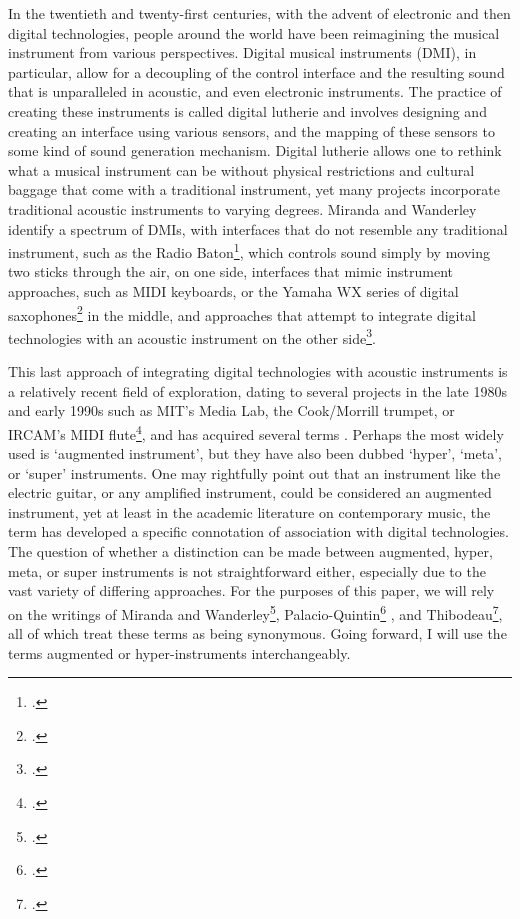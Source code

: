\documentclass[12pt,twoside,maitrise]{dms_ks}
\theoremstyle{definition}
\begin{document}

In the twentieth and twenty-first centuries, with the advent of electronic and then digital technologies, people around the world have been reimagining the musical instrument from various perspectives. 
Digital musical instruments (DMI), in particular, allow for a decoupling of the control interface and the resulting sound that is unparalleled in acoustic, and even electronic instruments.
The practice of creating these instruments is called digital lutherie and involves designing and creating an interface using various sensors, and the mapping of these sensors to some kind of sound generation mechanism.
Digital lutherie allows one to rethink what a musical instrument can be without physical restrictions and cultural baggage that come with a traditional instrument, yet many projects incorporate traditional acoustic instruments to varying degrees. 
Miranda and Wanderley identify a spectrum of DMIs, with interfaces that do not resemble any traditional instrument, such as the Radio Baton\footcite{miguel_ragussi_max_2013}, which controls sound simply by moving two sticks through the air, on one side, interfaces that mimic instrument approaches, such as MIDI keyboards, or the Yamaha WX series of digital saxophones\footcite{mkirino01_yamaha_2014} in the middle, and approaches that attempt to integrate digital technologies with an acoustic instrument on the other side\footcite[19-20]{miranda_new_2006}.



This last approach of integrating digital technologies with acoustic instruments is a relatively recent field of exploration, dating to several projects in the late 1980s and early 1990s such as MIT's Media Lab, the Cook/Morrill trumpet, or IRCAM's MIDI flute\footcite[22--25]{miranda_new_2006}, and has acquired several terms .
Perhaps the most widely used is `augmented instrument', but they have also been dubbed `hyper', `meta', or `super' instruments.
One may rightfully point out that an instrument like the electric guitar, or any amplified instrument, could be considered an augmented instrument, yet at least in the academic literature on contemporary music, the term has developed a specific connotation of association with digital technologies. 
The question of whether a distinction can be made between augmented, hyper, meta, or super instruments is not straightforward either, especially due to the vast variety of differing approaches.
For the purposes of this paper, we will rely on the writings of Miranda and Wanderley\footcite[21]{miranda_new_2006}, Palacio-Quintin\footcite[25]{palacio-quintin_composition_2012-1} , and Thibodeau\footcite[1]{thibodeau_trumpet_2011}, all of which treat these terms as being synonymous.
Going forward, I will use the terms augmented or hyper-instruments interchangeably.
\end{document}
